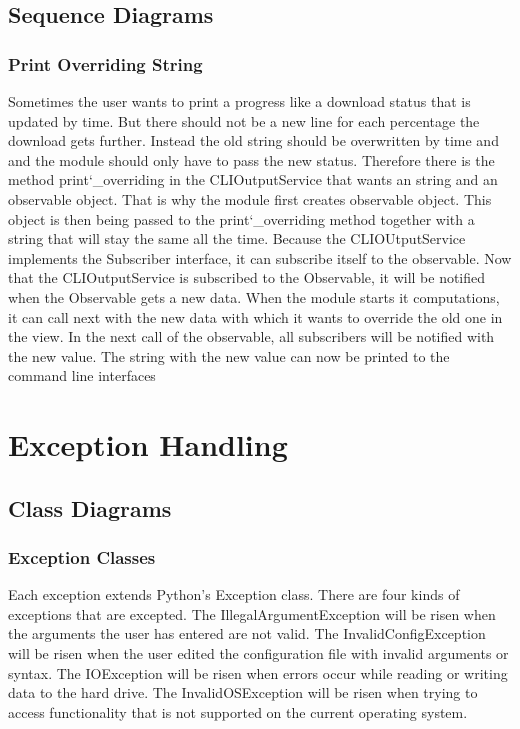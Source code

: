 \documentclass[parskip=full]{scrartcl}
\begin{document}
\subsection{Sequence Diagrams}

\subsubsection{Print Overriding String}



Sometimes the user wants to print a progress like a download status that is updated by time.
But there should not be a new line for each percentage the download gets further.
Instead the old string should be overwritten by time and and the module should only have to pass the new status.
Therefore there is the method print\char`_overriding in the CLIOutputService that wants an string and an observable object.
That is why the module first creates observable object.
This object is then being passed to the print\char`_overriding method together with a string that will stay the same all the time.
Because the CLIOUtputService implements the Subscriber interface, it can subscribe itself to the observable.
Now that the CLIOutputService is subscribed to the Observable, it will be notified when the Observable gets a new data.
When the module starts it computations, it can call next with the new data with which it wants to override the old one in the view.
In the next call of the observable, all subscribers will be notified with the new value.
The string with the new value can now be printed to the command line interfaces

\section{Exception Handling}

\subsection{Class Diagrams}

\subsubsection{Exception Classes}



Each exception extends Python's Exception class.
There are four kinds of exceptions that are excepted.
The IllegalArgumentException will be risen when the arguments the user has entered are not valid.
The InvalidConfigException will be risen when the user edited the configuration file with invalid arguments or syntax.
The IOException will be risen when errors occur while reading or writing data to the hard drive.
The InvalidOSException will be risen when trying to access functionality that is not supported on the current operating system.
\end{document}
